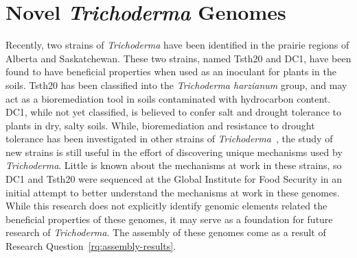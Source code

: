 

\section{Novel \textit{Trichoderma} Genomes}
\label{lit:novel-genomes}
Recently, two strains of \textit{Trichoderma}
have been identified in the prairie regions of Alberta and
Saskatchewan. These two strains, named Tsth20 and DC1, have been found
to have beneficial properties when used as an inoculant for plants in
the soils. Tsth20 has been classified into the \textit{Trichoderma harzianum} group, and may act as a bioremediation tool in soils contaminated with hydrocarbon content. DC1, while not yet classified, is believed to confer salt and drought tolerance to plants in dry, salty soils. While, bioremediation and resistance to drought tolerance has been investigated in other strains of
\textit{Trichoderma}~\cite{senizza2023}, the study of new strains is still useful in the effort of discovering unique mechanisms used by \textit{Trichoderma}. Little is known about the mechanisms at work in these strains, so DC1 and Tsth20 were sequenced at the Global Institute for Food Security in an initial attempt to better understand the mechanisms at work in these genomes. While this research does not explicitly identify genomic elements related the beneficial properties of these genomes, it may serve as a foundation for future research of \textit{Trichoderma}. The assembly of these genomes come as a result of Research Question~\ref{rq:assembly-results}.


